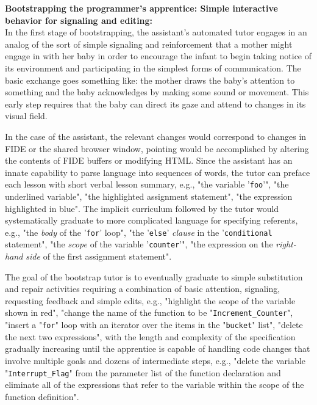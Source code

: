 {\bf{Bootstrapping the programmer's apprentice: Simple interactive behavior for signaling and editing:}}\\

In the first stage of bootstrapping, the assistant's automated tutor engages in an analog of the sort of simple signaling and reinforcement that a mother might engage in with her baby in order to encourage the infant to begin taking notice of its environment and participating in the simplest forms of communication. The basic exchange goes something like: the mother draws the baby's attention to something and the baby acknowledges by making some sound or movement. This early step requires that the baby can direct its gaze and attend to changes in its visual field.

In the case of the assistant, the relevant changes would correspond to changes in FIDE or the shared browser window, pointing would be accomplished by altering the contents of FIDE buffers or modifying HTML. Since the assistant has an innate capability to parse language into sequences of words, the tutor can preface each lesson with short verbal lesson summary, e.g., "the variable '{\tt{foo}}'", "the underlined variable", "the highlighted assignment statement", "the expression highlighted in blue". The implicit curriculum followed by the tutor would systematically graduate to more complicated language for specifying referents, e.g., "the {\it{body}} of the '{\tt{for}}' loop", "the '{\tt{else}}' {\it{clause}} in the '{\tt{conditional}} statement", "the {\it{scope}} of the variable '{\tt{counter}}'", "the expression on the {\it{right-hand side}} of the first assignment statement".

The goal of the bootstrap tutor is to eventually graduate to simple substitution and repair activities requiring a combination of basic attention, signaling, requesting feedback and simple edits, e.g., "highlight the scope of the variable shown in red", "change the name of the function to be "{\tt{Increment\_Counter}}", "insert a "{\tt{for}}" loop with an iterator over the items in the "{\tt{bucket}}" list", "delete the next two expressions", with the length and complexity of the specification gradually increasing until the apprentice is capable of handling code changes that involve multiple goals and dozens of intermediate steps, e.g., "delete the variable "{\tt{Interrupt\_Flag}}" from the parameter list of the function declaration and eliminate all of the expressions that refer to the variable within the scope of the function definition".

